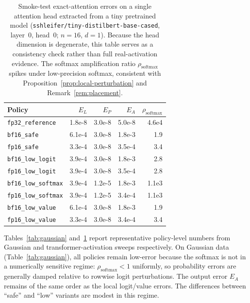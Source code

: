 \begin{table}[ht]
\centering
\caption{Smoke-test exact-attention errors on a single attention head extracted from a tiny pretrained model (\texttt{sshleifer/tiny-distilbert-base-cased}, layer~0, head~0; $n = 16$, $d = 1$). Because the head dimension is degenerate, this table serves as a consistency check rather than full real-activation evidence. The softmax amplification ratio $\rho_{\mathrm{softmax}}$ spikes under low-precision softmax, consistent with Proposition~\ref{prop:local-perturbation} and Remark~\ref{rem:placement}.}
\label{tab:transformer}
\small
\begin{tabular}{l rrr r}
\toprule
Policy & $E_L$ & $E_P$ & $E_A$ & $\rho_{\mathrm{softmax}}$ \\
\midrule
\texttt{fp32\_reference}    & 1.8e-8  & 3.0e-8  & 5.0e-8  & 4.6e4 \\
\texttt{bf16\_safe}         & 6.1e-4  & 3.0e-8  & 1.8e-3  & 1.9  \\
\texttt{fp16\_safe}         & 3.3e-4  & 3.0e-8  & 3.5e-4  & 3.4  \\
\midrule
\texttt{bf16\_low\_logit}   & 3.9e-4  & 3.0e-8  & 1.8e-3  & 2.8  \\
\texttt{fp16\_low\_logit}   & 3.9e-4  & 3.0e-8  & 3.5e-4  & 2.8  \\
\midrule
\texttt{bf16\_low\_softmax} & 3.9e-4  & 1.2e-5  & 1.8e-3  & 1.1e3 \\
\texttt{fp16\_low\_softmax} & 3.9e-4  & 1.2e-5  & 3.4e-4  & 1.1e3 \\
\midrule
\texttt{bf16\_low\_value}   & 6.1e-4  & 3.0e-8  & 1.8e-3  & 1.9  \\
\texttt{fp16\_low\_value}   & 3.3e-4  & 3.0e-8  & 3.4e-4  & 3.4  \\
\bottomrule
\end{tabular}
\end{table}

Tables~\ref{tab:gaussian} and~\ref{tab:transformer} report representative policy-level numbers from Gaussian and transformer-activation sweeps respectively. On Gaussian data (Table~\ref{tab:gaussian}), all policies remain low-error because the softmax is not in a numerically sensitive regime: $\rho_{\mathrm{softmax}} < 1$ uniformly, so probability errors are generally damped relative to rowwise logit perturbations. The output error $E_A$ remains of the same order as the local logit/value errors. The differences between ``safe'' and ``low'' variants are modest in this regime.

